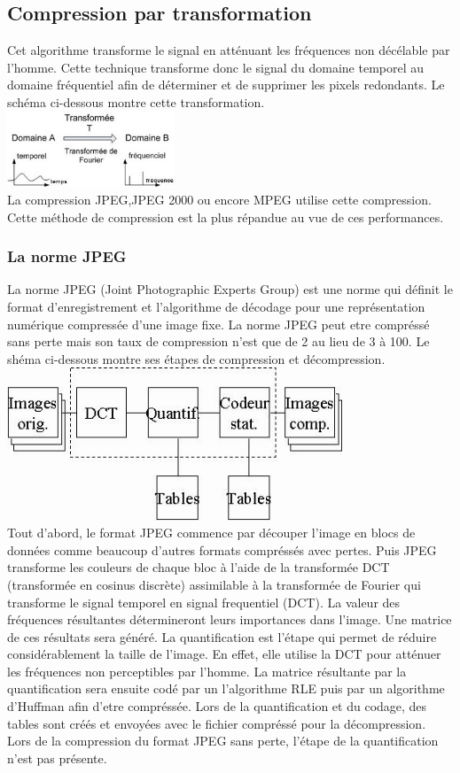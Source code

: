 \documentclass[a4paper]{report}
\begin{document}
	\subsection{Compression par transformation}
		Cet algorithme transforme le signal en atténuant les fréquences non décélable par l'homme. Cette technique transforme donc le signal du domaine temporel au domaine fréquentiel afin de déterminer et de supprimer les pixels redondants.  Le schéma ci-dessous montre cette transformation.\\
	\includegraphics[width=5cm]{transformation.jpg} \\
La compression JPEG,JPEG 2000 ou encore MPEG utilise cette compression. Cette méthode de compression est la plus répandue au vue de ces performances.
	\subsubsection{La norme JPEG}
		La norme JPEG (Joint Photographic Experts Group) est une norme qui définit le format d'enregistrement et l'algorithme de décodage pour une représentation numérique compressée d'une image fixe. La norme JPEG peut etre compréssé sans perte mais son taux de compression n'est que de 2 au lieu de 3 à 100.
Le shéma ci-dessous montre ses étapes de compression et décompression.\\
		\includegraphics[width=10cm]{schema.jpg} \\
		Tout d'abord, le format JPEG commence par découper l'image en blocs de données comme beaucoup d'autres formats compréssés avec pertes. Puis JPEG transforme les couleurs de chaque bloc à l'aide de la transformée DCT (transformée en cosinus discrète) assimilable à la transformée de Fourier qui transforme le signal temporel en signal frequentiel (DCT). La valeur des fréquences résultantes détermineront leurs importances dans l'image. Une matrice de ces résultats sera généré. La quantification est l'étape qui permet de réduire considérablement la taille de l'image. En effet, elle utilise la DCT pour atténuer les fréquences non perceptibles par l'homme. La matrice résultante par la quantification sera ensuite codé par un l'algorithme RLE puis par un algorithme d'Huffman afin d'etre compréssée. Lors de la quantification et du codage, des tables sont créés et envoyées avec le fichier compréssé pour la décompression.\\
	Lors de la compression du format JPEG sans perte, l'étape de la quantification n'est pas présente.
\end{document}
